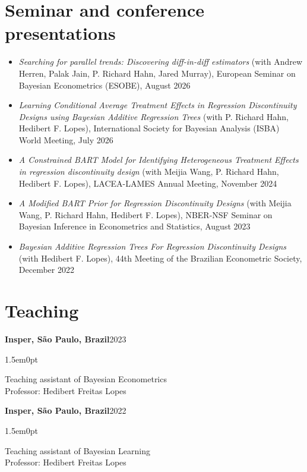 \documentclass[11pt]{article}
\newcommand{\entry}[3]{%
  \textbf{#2}\hfill #1\par\nopagebreak
  \begin{adjustwidth}{1.5em}{0pt}\raggedright #3\end{adjustwidth}\vspace{7pt}}
\begin{document}
\section{Seminar and conference presentations}
\label{sec:presentations}
\begin{itemize}[label={}, leftmargin=0pt, itemsep=7pt, topsep=0pt]
  \item \emph{Searching for parallel trends: Discovering diff-in-diff estimators} (with Andrew Herren, Palak Jain, P. Richard Hahn, Jared Murray), European Seminar on Bayesian Econometrics (ESOBE), August 2026
  \item \emph{Learning Conditional Average Treatment Effects in Regression Discontinuity Designs using Bayesian Additive Regression Trees} (with P. Richard Hahn, Hedibert F. Lopes), International Society for Bayesian Analysis (ISBA) World Meeting, July 2026
  \item \emph{A Constrained BART Model for Identifying Heterogeneous Treatment Effects in regression discontinuity design} (with Meijia Wang, P. Richard Hahn, Hedibert F. Lopes), LACEA-LAMES Annual Meeting, November 2024
  \item \emph{A Modified BART Prior for Regression Discontinuity Designs} (with Meijia Wang, P. Richard Hahn, Hedibert F. Lopes), NBER-NSF Seminar on Bayesian Inference in Econometrics and Statistics, August 2023
  \item \emph{Bayesian Additive Regression Trees For Regression Discontinuity Designs} (with Hedibert F. Lopes), 44th Meeting of the Brazilian Econometric Society, December 2022
\end{itemize}

\section{Teaching}
\label{sec:org3c7d8d1}
\entry{2023}{Insper, São Paulo, Brazil}{%
  Teaching assistant of Bayesian Econometrics\\
  Professor: Hedibert Freitas Lopes}
\entry{2022}{Insper, São Paulo, Brazil}{%
  Teaching assistant of Bayesian Learning\\
  Professor: Hedibert Freitas Lopes}
\end{document}
